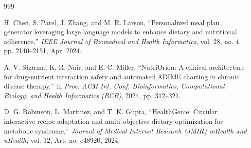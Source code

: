 \documentclass[a4paper,12pt]{report}
\begin{document}
\renewcommand{\bibname}{\uppercase{REFERENCES}}

\begin{thebibliography}{999}


H. Chen, S. Patel, J. Zhang, and M. R. Larson, ``Personalized meal plan generator leveraging large language models to enhance dietary and nutritional adherence,'' \textit{IEEE Journal of Biomedical and Health Informatics}, vol. 28, no. 4, pp. 2140--2151, Apr. 2024.

A. V. Sharma, K. R. Nair, and E. C. Miller, ``NutriOrion: A clinical architecture for drug-nutrient interaction safety and automated ADIME charting in chronic disease therapy,'' in \textit{Proc. ACM Int. Conf. Bioinformatics, Computational Biology, and Health Informatics (BCB)}, 2024, pp. 312--321.

D. G. Robinson, L. Martinez, and T. K. Gupta, ``HealthGenie: Circular interactive recipe adaptation and multi-objective dietary optimization for metabolic syndrome,'' \textit{Journal of Medical Internet Research (JMIR) mHealth and uHealth}, vol. 12, Art. no. e48920, 2024.

\end{thebibliography}
\end{document}
